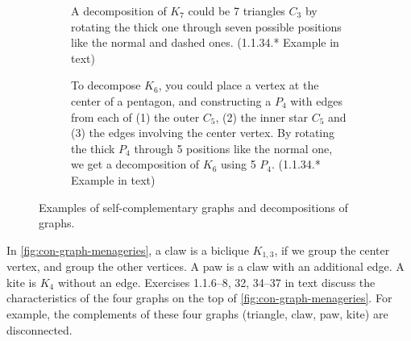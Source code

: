 \documentclass[../src/handouts/main.tex]{subfiles}
\begin{document}
\begin{figure}[htbp]
  \begin{subfigure}[t]{\subfiguresize}
    \centering
    \caption{A decomposition of $K_7$ could be 7 triangles $C_3$ by rotating the thick one through seven possible positions like the normal and dashed ones. (1.1.34.* Example in text)}
    \label{fig:con-self-comp-heptagon}
  \end{subfigure}
  \hspace{\hseparation}
  \begin{subfigure}[t]{\subfiguresize}
    \centering
    \caption{To decompose $K_6$, you could place a vertex at the center of a pentagon, and constructing a $P_4$ with edges from each of (1) the outer $C_5$, (2) the inner star $C_5$ and (3) the edges involving the center vertex. By rotating the thick $P_4$ through 5 positions like the normal one, we get a decomposition of $K_6$ using 5 $P_4$. (1.1.34.* Example in text)}
    \label{fig:con-self-comp-pentagon-cdot}
  \end{subfigure}
  \caption{Examples of self-complementary graphs and decompositions of graphs.}
  \label{fig:con-self-comp}
\end{figure}

In \cref{fig:con-graph-menageries}, a claw is a biclique $K_{1,3}$, if we group the center vertex, and group the other vertices. A paw is a claw with an additional edge. A kite is $K_4$ without an edge. Exercises 1.1.6--8, 32, 34--37 in text discuss the characteristics of the four graphs on the top of \cref{fig:con-graph-menageries}. For example, the complements of these four graphs (triangle, claw, paw, kite) are disconnected.
\end{document}
